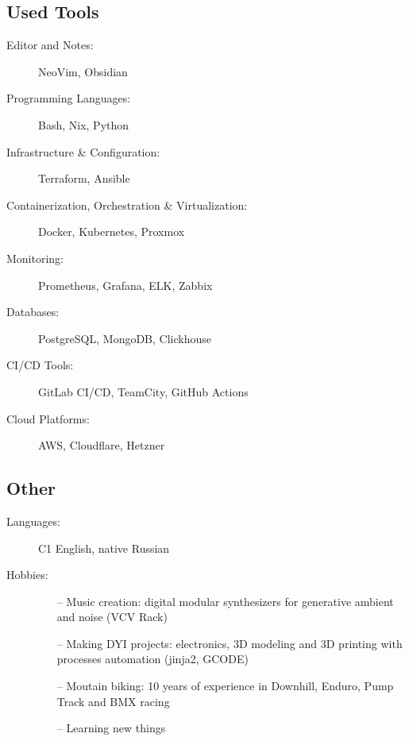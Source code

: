 \documentclass[10pt]{report}
\begin{document}
\goodbreak

\subsection*{Used Tools}
\begin{description}
  \item[Editor and Notes:]
        NeoVim, Obsidian
  \item[Programming Languages:]
        Bash, Nix, Python
  \item[Infrastructure \& Configuration:]
        Terraform, Ansible
  \item[Containerization, Orchestration \& Virtualization:]
        Docker, Kubernetes, Proxmox
  \item[Monitoring:]
        Prometheus, Grafana, ELK, Zabbix
  \item[Databases:]
        PostgreSQL, MongoDB, Clickhouse
  \item[CI/CD Tools:]
        GitLab CI/CD, TeamCity, GitHub Actions
  \item[Cloud Platforms:]
        AWS, Cloudflare, Hetzner
\end{description}

\subsection*{Other}
\begin{description}
  \item[Languages:]
        C1 English, native Russian
  \item[Hobbies:]
        \begin{itemize}
          \item[]
          \item[--] Music creation: digital modular synthesizers for generative ambient and noise (VCV Rack)
          \item[--] Making DYI projects: electronics, 3D modeling and 3D printing with processes automation (jinja2, GCODE)
          \item[--] Moutain biking: 10 years of experience in Downhill, Enduro, Pump Track and BMX racing
          \item[--] Learning new things
        \end{itemize}

\end{description}
\end{document}
